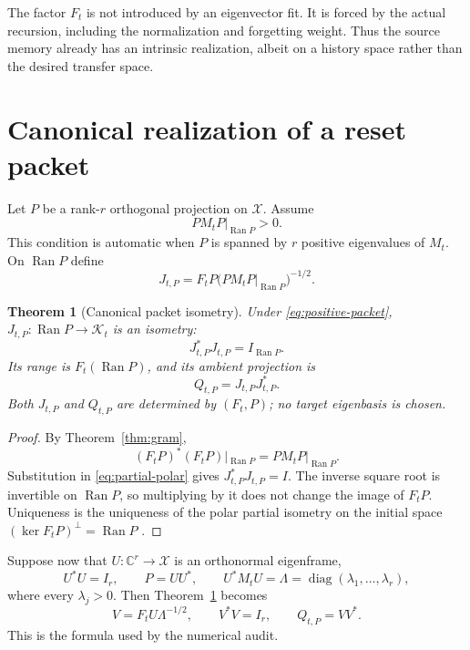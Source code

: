 \documentclass[12pt]{article}
\newtheorem{theorem}{Theorem}[section]
\theoremstyle{definition}
\theoremstyle{remark}
\newcommand{\cX}{\mathcal X}
\newcommand{\cK}{\mathcal K}
\newcommand{\Ran}{\operatorname{Ran}}
\begin{document}
The factor $F_t$ is not introduced by an eigenvector fit.  It is forced by
the actual recursion, including the normalization and forgetting weight.
Thus the source memory already has an intrinsic realization, albeit on a
history space rather than the desired transfer space.

\section{Canonical realization of a reset packet}

Let $P$ be a rank-$r$ orthogonal projection on $\cX$.  Assume
\begin{equation}\label{eq:positive-packet}
 PM_tP|_{\Ran P}>0.
\end{equation}
This condition is automatic when $P$ is spanned by $r$ positive eigenvalues
of $M_t$.  On $\Ran P$ define
\begin{equation}\label{eq:partial-polar}
 J_{t,P}=F_tP\bigl(PM_tP|_{\Ran P}\bigr)^{-1/2}.
\end{equation}

\begin{theorem}[Canonical packet isometry]\label{thm:polar}
Under \eqref{eq:positive-packet}, $J_{t,P}:\Ran P\to\cK_t$ is an isometry:
\[
 J_{t,P}^*J_{t,P}=I_{\Ran P}.
\]
Its range is $F_t(\Ran P)$, and its ambient projection is
\begin{equation}\label{eq:realized-projection}
 Q_{t,P}=J_{t,P}J_{t,P}^*.
\end{equation}
Both $J_{t,P}$ and $Q_{t,P}$ are determined by $(F_t,P)$; no target
eigenbasis is chosen.
\end{theorem}

\begin{proof}
By Theorem~\ref{thm:gram},
\[
 (F_tP)^*(F_tP)|_{\Ran P}=PM_tP|_{\Ran P}.
\]
Substitution in \eqref{eq:partial-polar} gives
$J_{t,P}^*J_{t,P}=I$.  The inverse square root is invertible on $\Ran P$,
so multiplying by it does not change the image of $F_tP$.  Uniqueness is the
uniqueness of the polar partial isometry on the initial space
$(\ker F_tP)^\perp=\Ran P$ \citep{Higham2008}.
\end{proof}

Suppose now that $U:\mathbb C^r\to\cX$ is an orthonormal eigenframe,
\[
 U^*U=I_r,
 \qquad P=UU^*,
 \qquad U^*M_tU=\Lambda=\operatorname{diag}(\lambda_1,\ldots,\lambda_r),
\]
where every $\lambda_j>0$.  Then Theorem~\ref{thm:polar} becomes
\begin{equation}\label{eq:frame-formula}
 V=F_tU\Lambda^{-1/2},
 \qquad V^*V=I_r,
 \qquad Q_{t,P}=VV^*.
\end{equation}
This is the formula used by the numerical audit.
\end{document}

